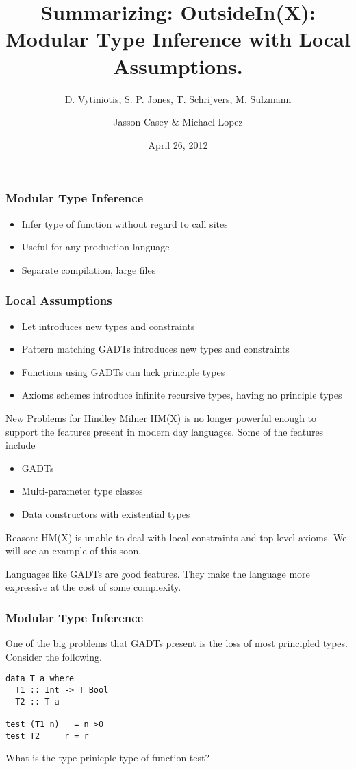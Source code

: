 \documentclass{beamer}
\title{Summarizing: OutsideIn(X): Modular Type Inference with Local Assumptions.}
\subtitle{D. Vytiniotis, S. P. Jones, T. Schrijvers, M. Sulzmann}
\author{Jasson Casey \& Michael Lopez}
\date{April 26, 2012}
\begin{document}
\begin{frame}
\titlepage
\end{frame}

\begin{frame}
\frametitle{Modular Type Inference}
\begin{itemize}
\item Infer type of function without regard to call sites
\item Useful for any production language
\item Separate compilation, large files
\end{itemize}
\end{frame}

\begin{frame}
\frametitle{Local Assumptions}
\begin{itemize}
\item Let introduces new types and constraints
\item Pattern matching GADTs introduces new types and constraints
\item Functions using GADTs can lack principle types
\item Axioms schemes introduce infinite recursive types, having no principle types
\end{itemize}
\end{frame}

\begin{frame}{New Problems for Hindley Milner}
HM(X) is no longer powerful enough to support the features present in modern day languages. Some of the features include
\begin{itemize}
\item GADTs
\item Multi-parameter type classes
\item Data constructors with existential types
\end{itemize}
Reason: HM(X) is unable to deal with local constraints and top-level axioms. We will see an example of this soon.

Languages like GADTs are {\emph good} features. They make the language more expressive at the cost of some complexity.
\end{frame}

\begin{frame}[fragile]
\frametitle{Modular Type Inference}
One of the big problems that GADTs present is the loss of most principled types. Consider the following.
\begin{lstlisting}
data T a where
  T1 :: Int -> T Bool
  T2 :: T a

test (T1 n) _ = n >0
test T2     r = r
\end{lstlisting}
What is the type prinicple type of function test?
\end{frame}
\end{document}
